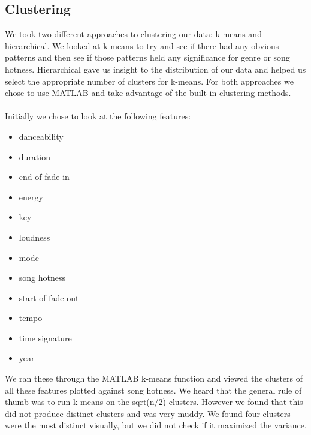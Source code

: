 \documentclass[12pt]{article}
\begin{document}
\subsection{Clustering}
\label{subsec:kMeans}
We took two different approaches to clustering our data: k-means and hierarchical. We looked at k-means to try and see if there had any obvious patterns and then see if those patterns held any significance for genre or song hotness. Hierarchical gave us insight to the distribution of our data and helped us select the appropriate number of clusters for k-means. For both approaches we chose to use MATLAB and take advantage of the built-in clustering methods.
\\ \\
Initially we chose to look at the following features:
\begin{itemize}
\item danceability
\vspace{-3.5mm}
\item duration
\vspace{-3.5mm}
\item end of fade in
\vspace{-3.5mm}
\item energy
\vspace{-3.5mm}
\item key
\vspace{-3.5mm}
\item loudness
\vspace{-3.5mm}
\item mode
\vspace{-3.5mm}
\item song hotness
\vspace{-3.5mm}
\item start of fade out
\vspace{-3.5mm} 
\item tempo
\vspace{-3.5mm}
\item time signature
\vspace{-3.5mm}
\item year
\end{itemize}

We ran these through the MATLAB k-means function and viewed the clusters of all these features plotted against song hotness. We heard that the general rule of thumb was to run k-means on the sqrt(n/2) clusters. However we found that this did not produce distinct clusters and was very muddy. We found four clusters were the most distinct visually, but we did not check if it maximized the variance.
\end{document}
